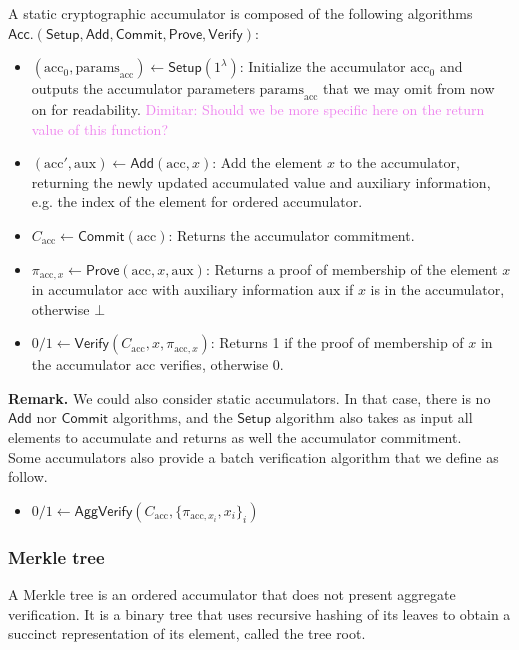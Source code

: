 \documentclass{article}
\newcommand{\acc}{\ensuremath{\textrm{acc}}\xspace}
\newcommand{\aux}{\ensuremath{\textrm{aux}}\xspace}
\newcommand{\pp}{\ensuremath{\textrm{params}}\xspace}
\newcommand{\Acc}{\ensuremath{\mathsf{Acc}}\xspace}
\newcommand{\Verify}{\ensuremath{\mathsf{Verify}}\xspace}
\newcommand{\AggVerify}{\ensuremath{\mathsf{AggVerify}}\xspace}
\newcommand{\Setup}{\ensuremath{\mathsf{Setup}}\xspace}
\newcommand{\Add}{\ensuremath{\mathsf{Add}}\xspace}
\newcommand{\Prove}{\ensuremath{\mathsf{Prove}}\xspace}
\newcommand{\Commit}{\ensuremath{\mathsf{Commit}}\xspace}
\newcommand{\dimitar}[1]{\textcolor{violet}{Dimitar: #1}\xspace}
\begin{document}
A static cryptographic accumulator is composed of the following algorithms $\Acc.(\Setup, \Add, \Commit, \Prove, \Verify)$:
\begin{itemize}
    \item $(\acc_0, \pp_\acc) \leftarrow \Setup(1^\lambda)$: Initialize the accumulator $\acc_0$ and outputs the accumulator parameters $\pp_\acc$ that we may omit from now on for readability.  \dimitar{Should we be more specific here on the return value of this function?}
    \item $(\acc', \aux) \leftarrow \Add(\acc, x)$: Add the element $x$ to the accumulator, returning the newly updated accumulated value and auxiliary information, e.g. the index of the element for ordered accumulator.
    \item $C_\acc \leftarrow \Commit(\acc)$: Returns the accumulator commitment.
    \item $\pi_{\acc, x} \leftarrow \Prove(\acc, x, \aux)$: Returns a proof of membership of the element $x$ in accumulator $\acc$ with auxiliary information $\aux$ if $x$ is in the accumulator, otherwise $\bot$
    \item $0/1 \leftarrow \Verify(C_\acc, x, \pi_{\acc, x})$: Returns 1 if the proof of membership of $x$ in the accumulator $\acc$ verifies, otherwise 0.
\end{itemize}

\noindent\textbf{Remark.} We could also consider static accumulators. In that case, there is no \Add nor \Commit algorithms, and the \Setup algorithm also takes as input all elements to accumulate and returns as well the accumulator commitment.\\

Some accumulators also provide a batch verification algorithm that we define as follow.
\begin{itemize}
    \item $0/1 \leftarrow \AggVerify(C_\acc, \{\pi_{\acc, x_i}, x_i\}_i)$
\end{itemize}

%
\subsubsection{Merkle tree}
A Merkle tree is an ordered accumulator that does not present aggregate verification. It is a binary tree that uses recursive hashing of its leaves to obtain a succinct representation of its element, called the tree root. 
\end{document}
